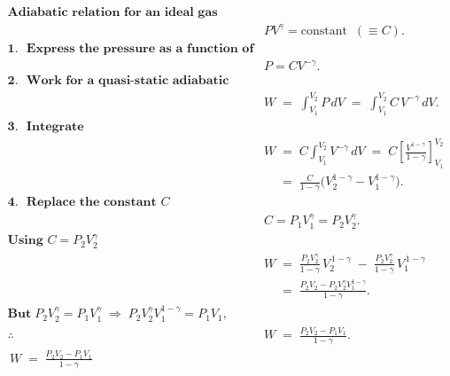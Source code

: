 \documentclass[12pt]{article}
\theoremstyle{definition} %
\theoremstyle{plain} %
\begin{document}
    \begin{align}
      \textbf{Adiabatic relation for an ideal gas} \\[4pt]
      & P V^{\gamma} = \text{constant} \;\;(\equiv C). \\[10pt]
      \textbf{1.~~Express the pressure as a function of volume} \\[4pt]
      & P = C V^{-\gamma}. \\[10pt]
      \textbf{2.~~Work for a quasi-static adiabatic path} \\[4pt]
      & W \;=\; \int_{V_1}^{V_2} P\,dV \;=\; \int_{V_1}^{V_2} C\,V^{-\gamma}\,dV. \\[10pt]
      \textbf{3.~~Integrate} \\[4pt]
      & W \;=\; C \int_{V_1}^{V_2} V^{-\gamma}\,dV
            \;=\; C\left[ \frac{V^{1-\gamma}}{1-\gamma} \right]_{V_1}^{V_2} \\[4pt]
      &\phantom{W} \;=\; \frac{C}{1-\gamma}\bigl(V_2^{1-\gamma} - V_1^{1-\gamma}\bigr). \\[10pt]
      \textbf{4.~~Replace the constant \(C\)} \\[4pt]
      & C = P_1 V_1^{\gamma} = P_2 V_2^{\gamma}. \\[10pt]
      \textbf{Using \(C = P_2 V_2^{\gamma}\)} \\[4pt]
      & W \;=\; \frac{P_2 V_2^{\gamma}}{1-\gamma}\,V_2^{\,1-\gamma}
               \;-\; \frac{P_2 V_2^{\gamma}}{1-\gamma}\,V_1^{\,1-\gamma} \\[4pt]
      &\phantom{W} \;=\; \frac{P_2 V_2 - P_2 V_2^{\gamma}V_1^{1-\gamma}}{1-\gamma}. \\[8pt]
      \textbf{But}\; P_2 V_2^{\gamma} = P_1 V_1^{\gamma} 
      \;\Longrightarrow\; P_2 V_2^{\gamma}V_1^{1-\gamma}=P_1V_1, \\[4pt]
      \therefore\; & W \;=\; \frac{P_2 V_2 - P_1 V_1}{1-\gamma}. \\[12pt]
      \boxed{\,W \;=\; \displaystyle \frac{P_2 V_2 - P_1 V_1}{1 - \gamma}\,}
      \end{align}
\end{document}
